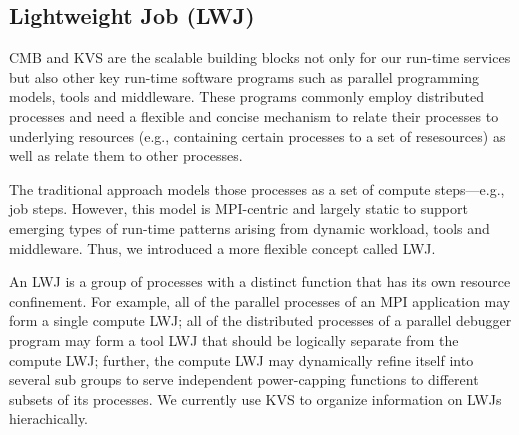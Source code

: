 \subsection{Lightweight Job (LWJ)}
CMB and KVS are the scalable building blocks not only for our run-time services 
but also other key run-time software programs such as parallel programming models, 
tools and middleware. These programs commonly employ distributed processes and need a 
flexible and concise mechanism to relate their processes to underlying resources 
(e.g., containing certain processes to a set of resesources) as well as relate 
them to other processes. 

The traditional approach models those processes as
a set of compute steps---e.g., job steps. However, this model 
is MPI-centric and largely static to support emerging types
of run-time patterns arising from dynamic workload, tools and middleware.
Thus, we introduced a more flexible concept called LWJ.

An LWJ is a group
of processes with a distinct function that has its own resource confinement. 
For example, all of the parallel
processes of an MPI application may form a single compute LWJ; all of the distributed processes
of a parallel debugger program may form a tool LWJ that should be logically separate from the
compute LWJ; further, the compute LWJ may dynamically refine itself into several 
sub groups to serve independent power-capping functions to different subsets of its processes.
We currently use KVS to organize information on LWJs hierachically.
